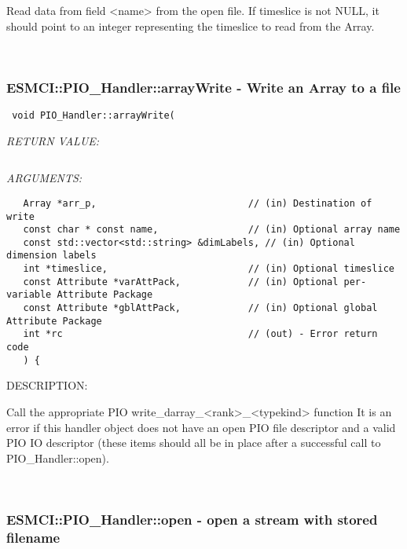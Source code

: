       Read data from field <name> from the open file. If timeslice is not
      NULL, it should point to an integer representing the timeslice to read
      from the Array.
   
 
\mbox{}\hrulefill\
 
\subsubsection [ESMCI::PIO\_Handler::arrayWrite] {ESMCI::PIO\_Handler::arrayWrite - Write an Array to a file}


  
\begin{verbatim} void PIO_Handler::arrayWrite(\end{verbatim}{\em RETURN VALUE:}
\begin{verbatim}      \end{verbatim}{\em ARGUMENTS:}
\begin{verbatim}   Array *arr_p,                           // (in) Destination of write
   const char * const name,                // (in) Optional array name
   const std::vector<std::string> &dimLabels, // (in) Optional dimension labels
   int *timeslice,                         // (in) Optional timeslice
   const Attribute *varAttPack,            // (in) Optional per-variable Attribute Package
   const Attribute *gblAttPack,            // (in) Optional global Attribute Package
   int *rc                                 // (out) - Error return code
   ) {\end{verbatim}
{\sf DESCRIPTION:\\ }


      Call the appropriate PIO write_darray_<rank>_<typekind> function
      It is an error if this handler object does not have an open 
      PIO file descriptor and a valid PIO IO descriptor (these items should
      all be in place after a successful call to PIO_Handler::open).
   
 
\mbox{}\hrulefill\
 
\subsubsection [ESMCI::PIO\_Handler::open] {ESMCI::PIO\_Handler::open - open a stream with stored filename}


